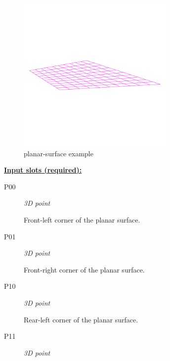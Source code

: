 \documentclass [11pt]{book}
\begin{document}
\begin{itemize}
\begin{figure}
\label{fig:example-code-planar-surface}

\end{figure}

\begin{figure}
\begin{center}
\includegraphics[width=3in,height=3in]{../images/example-planar-surface.pdf}
\end{center}

\caption{planar-surface example}

\label{fig:planar-surface}

\end{figure}





\textbf{
\underline{Input slots (required):}}

\begin{description}

\item [P00]
\emph{3D point}

 Front-left  corner of the planar surface.




\item [P01]
\emph{3D point}

 Front-right corner of the planar surface.




\item [P10]
\emph{3D point}

 Rear-left  corner of the planar surface.




\item [P11]
\emph{3D point}


\end{description}
\end{itemize}
\end{document}
